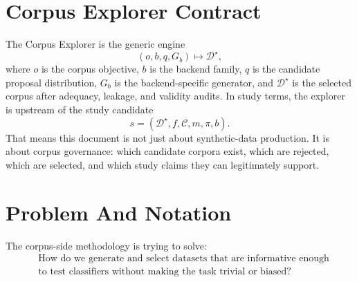 \documentclass[11pt]{article}
\begin{document}
\section{Corpus Explorer Contract}

The Corpus Explorer is the generic engine
\begin{equation}
(o, b, q, G_b)
\mapsto
\mathcal{D}^{\star},
\end{equation}
where \(o\) is the corpus objective, \(b\) is the backend family, \(q\) is the
candidate proposal distribution, \(G_b\) is the backend-specific generator, and
\(\mathcal{D}^{\star}\) is the selected corpus after adequacy, leakage, and
validity audits. In study terms, the explorer is upstream of the study
candidate
\begin{equation}
s = (\mathcal{D}^{\star}, f, \mathcal{C}, m, \pi, b).
\end{equation}
That means this document is not just about synthetic-data production. It is
about corpus governance: which candidate corpora exist, which are rejected,
which are selected, and which study claims they can legitimately support.

\section{Problem And Notation}

The corpus-side methodology is trying to solve:
\begin{equation}
\begin{aligned}
    &\text{How do we generate and select datasets that are informative enough}\\
    &\text{to test classifiers without making the task trivial or biased?}
\end{aligned}
\end{equation}
\end{document}

